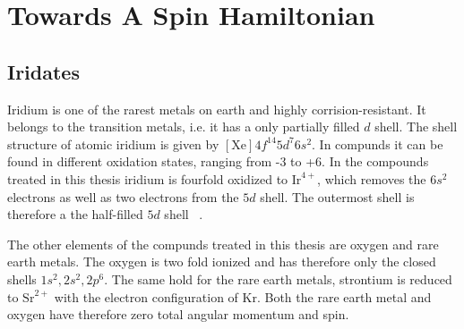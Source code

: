 \documentclass[a4paper,10pt]{report}
\begin{document}
  

\chapter{Towards A Spin Hamiltonian}

\section{Iridates}
Iridium is one of the rarest metals on earth and highly corrision-resistant. 
It belongs to the transition metals, i.e. it has a only partially filled $d$ shell.  
The shell structure of atomic iridium is given by $[\mathrm{Xe}]4f^{14}5d^7 6s^2$.
In compunds it can be found in different oxidation states, ranging from -3 to +6.
In the compounds treated in this thesis iridium is fourfold oxidized to $\mathrm{Ir}^{4+}$, 
which removes the $6s^2$ electrons as well as two electrons from the $5d$ shell. 
The outermost shell is therefore a the half-filled $5d$ shell ~\cite{Abragam70}.



The other elements of the compunds treated in this thesis are oxygen and rare earth metals. 
The oxygen is two fold ionized and has therefore only the closed shells $1s^2,2s^2,2p^6$.
The same hold for the rare earth metals, strontium is reduced to 
$\mathrm{Sr}^{2+}$ with the electron configuration of $\mathrm{Kr}$. 
Both the rare earth metal and oxygen have therefore zero total angular momentum and spin. 
\end{document}
